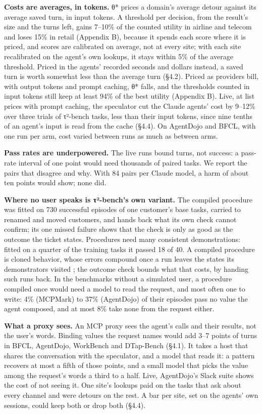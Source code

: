 \documentclass[10pt,twocolumn,letterpaper]{article}
\newcommand{\runin}[1]{{\sffamily\bfseries\color{accent}#1}}
\begin{document}
\runin{Costs are averages, in tokens.} θ* prices a domain's average detour against its average saved turn, in input tokens. A threshold per decision, from the result's size and the turns left, gains 7--10\% of the counted utility in airline and telecom and loses 15\% in retail (Appendix B), because it spends each score where it is priced, and scores are calibrated on average, not at every site; with each site recalibrated on the agent's own lookups, it stays within 5\% of the average threshold. Priced in the agents' recorded seconds and dollars instead, a saved turn is worth somewhat less than the average turn (§4.2). Priced as providers bill, with output tokens and prompt caching, θ* falls, and the thresholds counted in input tokens still keep at least 94\% of the best utility (Appendix B). Live, at list prices with prompt caching, the speculator cut the Claude agents' cost by 9--12\% over three trials of τ²-bench tasks, less than their input tokens, since nine tenths of an agent's input is read from the cache (§4.4). On AgentDojo and BFCL, with one run per arm, cost varied between runs as much as between arms.

\runin{Pass rates are underpowered.} The live runs bound turns, not success: a pass-rate interval of one point would need thousands of paired tasks. We report the pairs that disagree and why. With 84 pairs per Claude model, a harm of about ten points would show; none did.

\runin{Where no user speaks is τ²-bench's own variant.} The compiled procedure was fitted on 730 successful episodes of one customer's base tasks, carried to renamed and moved customers, and hands back what its own check cannot confirm; its one missed failure shows that the check is only as good as the outcome the ticket states. Procedures need many consistent demonstrations: fitted on a quarter of the training tasks it passed 18 of 40. A compiled procedure is cloned behavior, whose errors compound once a run leaves the states its demonstrators visited \citep{ross2011dagger}; the outcome check bounds what that costs, by handing such runs back. In the benchmarks without a simulated user, a procedure compiled once would need a model to read the request, and most often one to write: 4\% (MCPMark) to 37\% (AgentDojo) of their episodes pass no value the agent composed, and at most 8\% take none from the request either.

\runin{What a proxy sees.} An MCP proxy sees the agent's calls and their results, not the user's words. Binding values the request names would add 3--7 points of turns in BFCL, AgentDojo, WorkBench and DTap-Bench (§4.1). It takes a host that shares the conversation with the speculator, and a model that reads it: a pattern recovers at most a fifth of those points, and a small model that picks the value among the request's words a third to a half. Live, AgentDojo's Slack suite shows the cost of not seeing it. One site's lookups paid on the tasks that ask about every channel and were detours on the rest. A bar per site, set on the agents' own sessions, could keep both or drop both (§4.4).
\end{document}
